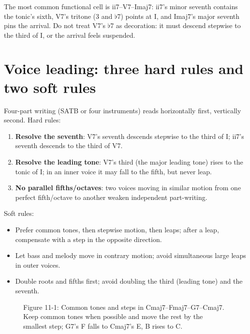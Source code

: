 The most common functional cell is ii7--V7--Imaj7: ii7's minor seventh contains the tonic's sixth, V7's tritone (3 and \(\flat\)7) points at I, and Imaj7's major seventh pins the arrival. Do not treat V7's \(\flat\)7 as decoration: it must descend stepwise to the third of I, or the arrival feels suspended.

\section{Voice leading: three hard rules and two soft rules}

Four-part writing (SATB or four instruments) reads horizontally first, vertically second. Hard rules:

\begin{enumerate}
  \item \textbf{Resolve the seventh}: V7's seventh descends stepwise to the third of I; ii7's seventh descends to the third of V7.
  \item \textbf{Resolve the leading tone}: V7's third (the major leading tone) rises to the tonic of I; in an inner voice it may fall to the fifth, but never leap.
  \item \textbf{No parallel fifths/octaves}: two voices moving in similar motion from one perfect fifth/octave to another weaken independent part-writing.
\end{enumerate}

Soft rules:

\begin{itemize}
  \item Prefer common tones, then stepwise motion, then leaps; after a leap, compensate with a step in the opposite direction.
  \item Let bass and melody move in contrary motion; avoid simultaneous large leaps in outer voices.
  \item Double roots and fifths first; avoid doubling the third (leading tone) and the seventh.
\end{itemize}

\begin{figure}[htbp]
\centering
{}
\caption*{Figure 11-1: Common tones and steps in Cmaj7--Fmaj7--G7--Cmaj7. Keep common tones when possible and move the rest by the smallest step; G7's F falls to Cmaj7's E, B rises to C.}
\end{figure}

